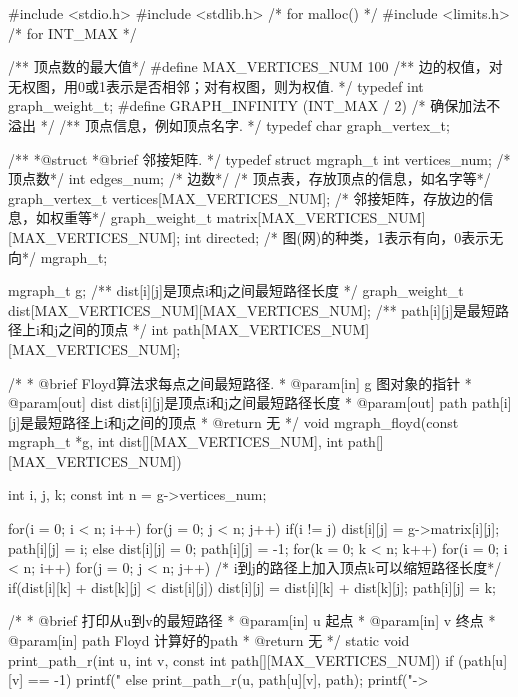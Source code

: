 \begin{Codex}[label=mgraph_floyd.c]
#include <stdio.h>
#include <stdlib.h>  /* for malloc() */
#include <limits.h>  /* for INT_MAX */

/** 顶点数的最大值*/
#define MAX_VERTICES_NUM 100
/** 边的权值，对无权图，用0或1表示是否相邻；对有权图，则为权值. */
typedef int graph_weight_t;
#define GRAPH_INFINITY (INT_MAX / 2)   /* 确保加法不溢出 */
/** 顶点信息，例如顶点名字. */
typedef char graph_vertex_t;

/**
 *@struct
 *@brief 邻接矩阵.
 */
typedef struct mgraph_t {
    int vertices_num; /* 顶点数*/
    int edges_num; /* 边数*/
    /* 顶点表，存放顶点的信息，如名字等*/
    graph_vertex_t vertices[MAX_VERTICES_NUM];
    /* 邻接矩阵，存放边的信息，如权重等*/
    graph_weight_t matrix[MAX_VERTICES_NUM][MAX_VERTICES_NUM];
    int directed; /* 图(网)的种类，1表示有向，0表示无向*/
} mgraph_t;


mgraph_t g;
/** dist[i][j]是顶点i和j之间最短路径长度 */
graph_weight_t dist[MAX_VERTICES_NUM][MAX_VERTICES_NUM];
/** path[i][j]是最短路径上i和j之间的顶点 */
int path[MAX_VERTICES_NUM][MAX_VERTICES_NUM];


/*
  * @brief Floyd算法求每点之间最短路径.
  * @param[in] g 图对象的指针
  * @param[out] dist dist[i][j]是顶点i和j之间最短路径长度
  * @param[out] path path[i][j]是最短路径上i和j之间的顶点
  * @return 无
  */
void mgraph_floyd(const mgraph_t *g,
       int dist[][MAX_VERTICES_NUM],
       int path[][MAX_VERTICES_NUM]) {
    int i, j, k;
    const int n = g->vertices_num;

    for(i = 0; i < n; i++) {
        for(j = 0; j < n; j++) {
            if(i != j) {
                dist[i][j] = g->matrix[i][j];
                path[i][j] = i;
            } else {
                dist[i][j] = 0;
                path[i][j] = -1;
            }
        }
    }
    for(k = 0; k < n; k++) {
        for(i = 0; i < n; i++) {
            for(j = 0; j < n; j++) {
                /* i到j的路径上加入顶点k可以缩短路径长度*/
                if(dist[i][k] + dist[k][j] < dist[i][j]) {
                    dist[i][j] = dist[i][k] + dist[k][j];
                    path[i][j] = k;
                }
            }
        }
    }
}

/*
 * @brief 打印从u到v的最短路径
 * @param[in] u 起点
 * @param[in] v 终点
 * @param[in] path Floyd 计算好的path
 * @return 无
 */
static void print_path_r(int u, int v, const int path[][MAX_VERTICES_NUM]) {
    if (path[u][v] == -1) {
        printf("%
    } else {
        print_path_r(u, path[u][v], path);
        printf("->%
    }
}


\end{Codex}
